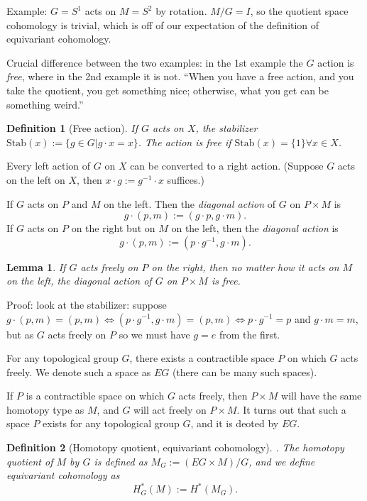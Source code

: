\documentclass{article}
\theoremstyle{mystyle}
\newtheorem*{definition}{Definition}%
\newtheorem*{lemma*}{Lemma}
\theoremstyle{remark}
\numberwithin{equation}{section}
\begin{document}
Example: $G = S^1$ acts on $M=S^2$ by rotation. $M/G = I$, so the quotient space cohomology is trivial, which is off of our expectation of the definition of equivariant cohomology.

Crucial difference between the two examples: in the 1st example the $G$ action is \emph{free}, where in the 2nd example it is not. ``When you have a free action, and you take the quotient, you get something nice; otherwise, what you get can be something weird.''

\begin{definition}[Free action] If $G$ acts on $X$, the stabilizer $\text{Stab}(x) := \{g\in G|g\cdot x = x\}$. The action is \emph{free} if $\text{Stab}(x) = \{1\}\forall x \in X$. 
\end{definition}

Every left action of $G$ on $X$ can be converted to a right action. (Suppose $G$ acts on the left on $X$, then $x\cdot g := g^{-1}\cdot x$ suffices.)

If $G$ acts on $P$ and $M$ on the left. Then the \emph{diagonal action} of $G$ on $P\times M$ is
$$g\cdot (p,m) := (g\cdot p,g\cdot m).$$
If $G$ acts on $P$ on the right but on $M$ on the left, then the \emph{diagonal action} is
$$g\cdot (p,m):=(p\cdot g^{-1},g\cdot m).$$

\begin{lemma*} If $G$ acts freely on $P$ on the right, then no matter how it acts on $M$ on the left, the diagonal action of $G$ on $P\times M$ is free.
\end{lemma*}


Proof: look at the stabilizer: suppose $g\cdot (p,m) = (p,m)\Leftrightarrow (p\cdot g^{-1},g\cdot m) = (p,m)\Leftrightarrow p\cdot g^{-1} = p$ and $g\cdot m = m$, but as $G$ acts freely on $P$ so we must have $g=e$ from the first. 


For any topological group $G$, there exists a contractible space $P$ on which $G$ acts freely. We denote such a space as $EG$ (there can be many such spaces).



If $P$ is a contractible space on which $G$ acts freely, then $P\times M$ will have the same homotopy type as $M$, and $G$ will act freely on $P\times M$. It turns out that such a space $P$ exists for any topological group $G$, and it is deoted by $EG$.


\begin{definition}[Homotopy quotient, equivariant cohomology]. The \emph{homotopy quotient} of $M$ by $G$ is defined as $M_G:=(EG\times M)/G$, and we define \emph{equivariant cohomology} as $$H^*_G(M):=H^*(M_G).$$
\end{definition}
\end{document}
